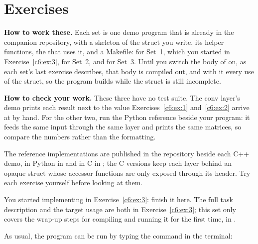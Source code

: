 
\section{Exercises}
\label{c7:sec:exercises}

\begin{aside}
\textbf{How to work these.} Each set is one demo program that is already in the companion
repository, with a skeleton of the struct you write, its helper functions, the  that
uses it, and a Makefile:  for Set~1, which you
started in Exercise~\ref{c6:ex:3},  for
Set~2, and  for Set~3. Until you switch the
body of  on, as each set's last exercise describes, that body is compiled out, and with
it every use of the struct, so the program builds while the struct is still incomplete.

\textbf{How to check your work.} These three have no test suite. The conv layer's demo prints each
result next to the value Exercises~\ref{c6:ex:1} and~\ref{c6:ex:2} arrive at by hand. For the other
two, run the Python reference beside your program: it feeds the same input through the same layer
and prints the same matrices, so compare the numbers rather than the formatting.

The reference implementations are published in the repository beside each C++ demo, in Python in
 and in C in ; the C versions keep each layer behind an opaque struct whose
accessor functions are only exposed through its header. Try each exercise yourself before looking
at them.
\end{aside}

\label{c7:set:1}\label{c7:app:a}
You started implementing  in Exercise~\ref{c6:ex:3}: finish it here. The full
task description and the target  usage are both in Exercise~\ref{c6:ex:3}; this set
only covers the wrap-up steps for compiling and running it for the first time, in
.

\label{c7:ex:1}
As usual, the program can be run by typing the command  in the terminal:

